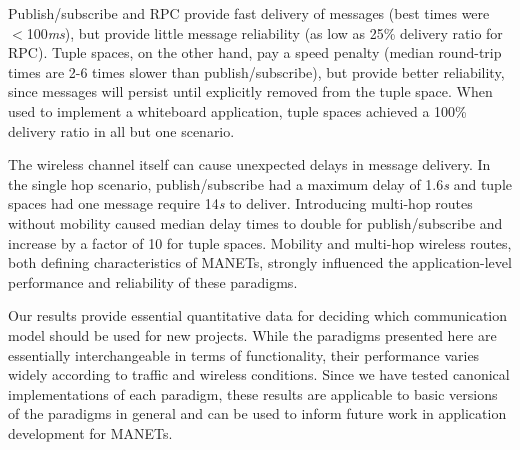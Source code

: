 \documentclass[lnicst]{svmultln}
\begin{document}
Publish/subscribe and RPC provide fast delivery of messages (best times were $<$100\textit{ms}), but provide little message reliability (as low as 25\% delivery ratio for RPC). Tuple spaces, on the other hand, pay a speed penalty (median round-trip times are 2-6 times slower than publish/subscribe), but provide better reliability, since messages will persist until explicitly removed from the tuple space. When used to implement a whiteboard application, tuple spaces achieved a 100\% delivery ratio in all but one scenario.

The wireless channel itself can cause unexpected delays in message delivery. In the single hop scenario, publish/subscribe had a maximum delay of 1.6\textit{s} and tuple spaces had one message require 14\textit{s} to deliver. Introducing multi-hop routes without mobility caused median delay times to double for publish/subscribe and increase by a factor of 10 for tuple spaces. Mobility and multi-hop wireless routes, both defining characteristics of MANETs, strongly influenced the application-level performance and reliability of these paradigms.


Our results provide essential quantitative data for deciding which communication model should be used for new projects. While the paradigms presented here are essentially interchangeable in terms of functionality, their performance varies widely according to traffic and wireless conditions. Since we have tested canonical implementations of each paradigm, these results are applicable to basic versions of the paradigms in general and can be used to inform future work in application development for MANETs.



\end{document}

